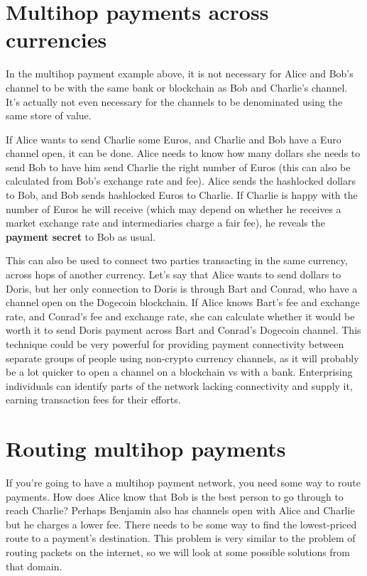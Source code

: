 \documentclass[a4paper]{article}
\newcommand{\bgls}[1]{\textbf{\gls{#1}}}
\begin{document}
\section{Multihop payments across currencies}

In the multihop payment example above, it is not necessary for Alice and Bob's channel to be with the same bank or blockchain as Bob and Charlie's channel. It's actually not even necessary for the channels to be denominated using the same store of value.

If Alice wants to send Charlie some Euros, and Charlie and Bob have a Euro channel open, it can be done. Alice needs to know how many dollars she needs to send Bob to have him send Charlie the right number of Euros (this can also be calculated from Bob's exchange rate and fee). Alice sends the hashlocked dollars to Bob, and Bob sends hashlocked Euros to Charlie. If Charlie is happy with the number of Euros he will receive (which may depend on whether he receives a market exchange rate and intermediaries charge a fair fee), he reveals the \bgls{payment secret} to Bob as usual.

This can also be used to connect two parties transacting in the same currency, across hops of another currency. Let's say that Alice wants to send dollars to Doris, but her only connection to Doris is through Bart and Conrad, who have a channel open on the Dogecoin blockchain. If Alice knows Bart's fee and exchange rate, and Conrad's fee and exchange rate, she can calculate whether it would be worth it to send Doris payment across Bart and Conrad's Dogecoin channel. This technique could be very powerful for providing payment connectivity between separate groups of people using non-crypto currency channels, as it will probably be a lot quicker to open a channel on a blockchain vs with a bank. Enterprising individuals can identify parts of the network lacking connectivity and supply it, earning transaction fees for their efforts.

\section{Routing multihop payments}

If you're going to have a multihop payment network, you need some way to route payments. How does Alice know that Bob is the best person to go through to reach Charlie? Perhaps Benjamin also has channels open with Alice and Charlie but he charges a lower fee. There needs to be some way to find the lowest-priced route to a payment's destination. This problem is very similar to the problem of routing packets on the internet, so we will look at some possible solutions from that domain.
\end{document}
